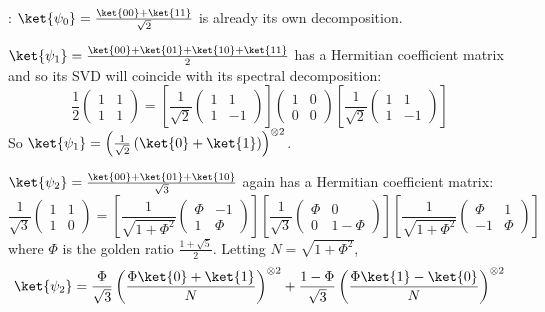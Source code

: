 \par {}:
%
$\ket{\psi_0} = \frac{\ket{00} + \ket{11}}{\sqrt{2}}$ is already its own decomposition.
%
\par $\ket{\psi_1} = \frac{\ket{00} + \ket{01} + \ket{10} + \ket{11}}{2}$ has a Hermitian coefficient matrix and so its SVD will coincide with its spectral decomposition:
%
$$
\frac{1}{2} \begin{pmatrix} 1 & 1 \\ 1 & 1 \end{pmatrix} =
\left[ \frac{1}{\sqrt{2}} \begin{pmatrix} 1 & 1 \\ 1 & -1 \end{pmatrix} \right]
\begin{pmatrix} 1 & 0 \\ 0 & 0 \end{pmatrix}
\left[ \frac{1}{\sqrt{2}} \begin{pmatrix} 1 & 1 \\ 1 & -1 \end{pmatrix} \right]
$$
%
So $\ket{\psi_1} = \left( \frac{1}{\sqrt{2}} \left( \ket{0} + \ket{1} \right) \right)^{\otimes 2}$.
%
\par $\ket{\psi_2} = \frac{\ket{00} + \ket{01} + \ket{10}}{\sqrt{3}}$ again has a Hermitian coefficient matrix:
%
$$
\frac{1}{\sqrt{3}} \begin{pmatrix} 1 & 1 \\ 1 & 0 \end{pmatrix} =
\left[ \frac{1}{\sqrt{1 + \Phi^2}} \begin{pmatrix} \Phi & -1 \\ 1 & \Phi \end{pmatrix} \right]
\left[ \frac{1}{\sqrt{3}} \begin{pmatrix} \Phi & 0 \\ 0 & 1 - \Phi \end{pmatrix} \right]
\left[ \frac{1}{\sqrt{1 + \Phi^2}} \begin{pmatrix} \Phi & 1 \\ -1 & \Phi \end{pmatrix} \right]
$$
%
where $\Phi$ is the golden ratio $\frac{1 + \sqrt{5}}{2}$.
%
Letting $N = \sqrt{1 + \Phi^2}$,
$$
\ket{\psi_2}
= \frac{\Phi}{\sqrt{3}} \left( \frac{\Phi \ket{0} + \ket{1}}{N} \right)^{\otimes 2}
+ \frac{1 - \Phi}{\sqrt{3}} \left( \frac{\Phi \ket{1} - \ket{0}}{N} \right)^{\otimes 2}
$$
